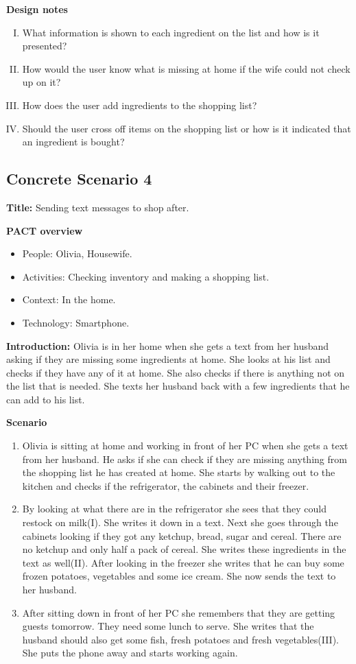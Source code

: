 \textbf{Design notes}

\begin{enumerate} [(I)]
\item What information is shown to each ingredient on the list and how is it presented?
\item How would the user know what is missing at home if the wife could not check up on it?
\item How does the user add ingredients to the shopping list?
\item Should the user cross off items on the shopping list or how is it indicated that an ingredient is bought? 
\end{enumerate}

\subsection{Concrete Scenario 4} \label{ConcreteScenario4}

\textbf{Title:} Sending text messages to shop after.

\textbf{PACT overview}
\begin{itemize}
\item People: Olivia, Housewife.  
\item Activities: Checking inventory and making a shopping list.
\item Context: In the home.
\item Technology: Smartphone.  
\end{itemize}

\textbf{Introduction:} Olivia is in her home when she gets a text from her husband asking if they are missing some ingredients at home. She looks at his list and checks if they have any of it at home. She also checks if there is anything not on the list that is needed. She texts her husband back with a few ingredients that he can add to his list.

\textbf{Scenario}
\begin{enumerate}
\item Olivia is sitting at home and working in front of her PC when she gets a text from her husband. He asks if she can check if they are missing anything from the shopping list he has created at home. She starts by walking out to the kitchen and checks if the refrigerator, the cabinets and their freezer.
\item By looking at what there are in the refrigerator she sees that they could restock on milk(I). She writes it down in a text. Next she goes through the cabinets looking if they got any ketchup, bread, sugar and cereal. There are no ketchup and only half a pack of cereal. She writes these ingredients in the text as well(II). After looking in the freezer she writes that he can buy some frozen potatoes, vegetables and some ice cream. She now sends the text to her husband.  
\item After sitting down in front of her PC she remembers that they are getting guests tomorrow. They need some lunch to serve. She writes that the husband should also get some fish, fresh potatoes and fresh vegetables(III). She puts the phone away and starts working again. 
\end{enumerate}


